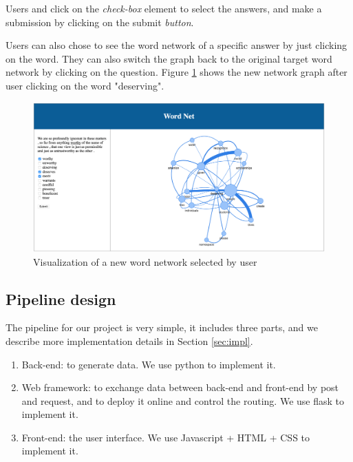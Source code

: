 Users and click on the \textit{check-box} element to select the answers, and make a submission by clicking on the submit \textit{button}.

Users can also chose to see the word network of a specific answer by just clicking on the word. They can also switch the graph back to the original target word network by clicking on the question. Figure \ref{fig:net_demo_new} shows the new network graph after user clicking on the word "deserving".

\begin{figure}[h]
\centering
\includegraphics[width=\linewidth]{figure/net_demo_new}
\caption{Visualization of a new word network selected by user}
\label{fig:net_demo_new}
\end{figure}


\subsection{Pipeline design}


The pipeline for our project is very simple, it includes three parts, and we describe more implementation details in Section \ref{sec:impl}.

\begin{enumerate}
	\item Back-end: to generate data. We use python to implement it.
	
	\item Web framework: to exchange data between back-end and front-end by post and request, and to deploy it online and control the routing. We use flask to implement it.
	
	\item Front-end: the user interface. We use Javascript + HTML + CSS to implement it.
\end{enumerate}
